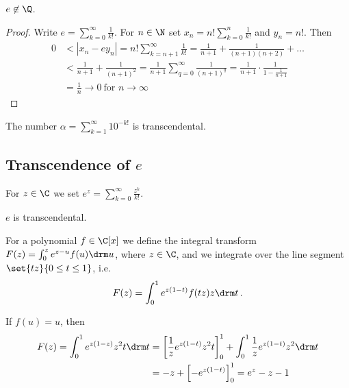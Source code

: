 \begin{thmn}
	\( e \not\in \Q \).
\end{thmn}

\begin{proof}
	Write \( e = \sum_{k=0}^{\infty} \frac{1}{k!} \).
	For \( n \in \N \) set \( x_n = n! \sum_{k=0}^{n} \frac{1}{k!} \) and \( y_n = n! \).
	Then
	\begin{align*}
		0 &< \left| x_n - e y_n \right| = n! \sum_{k=n+1}^{\infty} \frac{1}{k!} = \frac{1}{n+1} + \frac{1}{(n+1)(n+2)} + \dots\\
		&< \frac{1}{n+1} + \frac{1}{(n+1)^2} = \frac{1}{n+1} \sum_{q=0}^{\infty} \frac{1}{(n+1)^q} = \frac{1}{n+1} \cdot \frac{1}{1 - \frac{1}{n+1}}\\
		&= \frac{1}{n} \to 0 \ \text{for } n \to \infty
	\end{align*}
\end{proof}

\begin{thmn}
	The number \( \alpha = \sum_{k=1}^{\infty} 10^{-k!} \) is transcendental.
\end{thmn}

\subsection*{Transcendence of \( e \)}

For \( z \in \C \) we set \( e^z = \sum_{k=0}^{\infty} \frac{z^k}{k!} \).

\begin{thmn}
	\label{thm:4.8}
	\( e \) is transcendental.
\end{thmn}

For a polynomial \( f \in \C[x] \) we define the integral transform \( F(z) = \int_{0}^{z} e^{z-u} f(u) \drm u \), where \( z \in \C \), and we integrate over the line segment \( \set{tz}{0 \leq t \leq 1} \), i.e.
\[ F(z) = \int_{0}^{1} e^{z(1-t)} f(tz) z \drm t \,. \]

\begin{exmp*}
	If \( f(u) = u \), then 
	\begin{align*}
		F(z) = \int_{0}^{1} e^{z (1-z)} z^2 t \drm t &= \left[ \frac{1}{z} e^{z(1-t)} z^2 t \right]_0^1 + \int_{0}^{1} \frac{1}{z} e^{z(1-t)} z^2 \drm t\\
		&= -z + \left[ -e^{z(1-t)} \right]_0^1 = e^z - z - 1
	\end{align*}
\end{exmp*}

